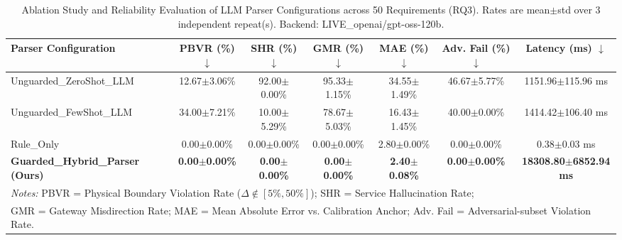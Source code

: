 \begin{table}[t]
\centering
\caption{Ablation Study and Reliability Evaluation of LLM Parser Configurations across 50 Requirements (RQ3).
Rates are mean$\pm$std over 3 independent repeat(s). Backend: LIVE\_openai/gpt-oss-120b.}
\label{tab:parser_ablation}
\begin{tabular}{lcccccc}
\toprule
\textbf{Parser Configuration} & \textbf{PBVR (\%)} $\downarrow$ & \textbf{SHR (\%)} $\downarrow$ & \textbf{GMR (\%)} $\downarrow$ & \textbf{MAE (\%)} $\downarrow$ & \textbf{Adv. Fail (\%)} $\downarrow$ & \textbf{Latency (ms)} $\downarrow$ \\
\midrule
Unguarded\_ZeroShot\_LLM & 12.67$\pm$3.06\% & 92.00$\pm$0.00\% & 95.33$\pm$1.15\% & 34.55$\pm$1.49\% & 46.67$\pm$5.77\% & 1151.96$\pm$115.96 ms \\
Unguarded\_FewShot\_LLM & 34.00$\pm$7.21\% & 10.00$\pm$5.29\% & 78.67$\pm$5.03\% & 16.43$\pm$1.45\% & 40.00$\pm$0.00\% & 1414.42$\pm$106.40 ms \\
Rule\_Only & 0.00$\pm$0.00\% & 0.00$\pm$0.00\% & 0.00$\pm$0.00\% & 2.80$\pm$0.00\% & 0.00$\pm$0.00\% & 0.38$\pm$0.03 ms \\
\textbf{Guarded\_Hybrid\_Parser (Ours)} & \textbf{0.00$\pm$0.00\%} & \textbf{0.00$\pm$0.00\%} & \textbf{0.00$\pm$0.00\%} & \textbf{2.40$\pm$0.08\%} & \textbf{0.00$\pm$0.00\%} & \textbf{18308.80$\pm$6852.94 ms} \\
\bottomrule
\multicolumn{7}{l}{\footnotesize \textit{Notes:} PBVR = Physical Boundary Violation Rate ($\Delta \notin [5\%, 50\%]$); SHR = Service Hallucination Rate;} \\
\multicolumn{7}{l}{\footnotesize GMR = Gateway Misdirection Rate; MAE = Mean Absolute Error vs. Calibration Anchor; Adv. Fail = Adversarial-subset Violation Rate.}
\end{tabular}
\end{table}
